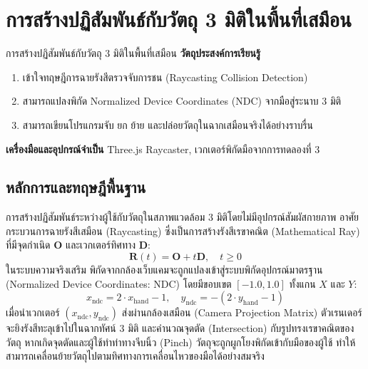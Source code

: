 
\chapter{การสร้างปฏิสัมพันธ์กับวัตถุ 3 มิติในพื้นที่เสมือน}
\label{ch:lab04}


\vspace{0.4cm}

\begin{labobjectivebox}{การสร้างปฏิสัมพันธ์กับวัตถุ 3 มิติในพื้นที่เสมือน}
\textbf{วัตถุประสงค์การเรียนรู้}
\begin{enumerate}[leftmargin=1.8cm, itemsep=2pt]
    \item เข้าใจทฤษฎีการฉายรังสีตรวจจับการชน (Raycasting Collision Detection)
    \item สามารถแปลงพิกัด Normalized Device Coordinates (NDC) จากมือสู่ระนาบ 3 มิติ
    \item สามารถเขียนโปรแกรมจับ ยก ย้าย และปล่อยวัตถุในฉากเสมือนจริงได้อย่างราบรื่น
\end{enumerate}

\vspace{4pt}
\textbf{เครื่องมือและอุปกรณ์จำเป็น} \enspace Three.js Raycaster, เวกเตอร์พิกัดมือจากการทดลองที่ 3
\end{labobjectivebox}

\section{หลักการและทฤษฎีพื้นฐาน}

การสร้างปฏิสัมพันธ์ระหว่างผู้ใช้กับวัตถุในสภาพแวดล้อม 3 มิติโดยไม่มีอุปกรณ์สัมผัสกายภาพ อาศัยกระบวนการฉายรังสีเสมือน (Raycasting) ซึ่งเป็นการสร้างรังสีเรขาคณิต (Mathematical Ray) ที่มีจุดกำเนิด $\mathbf{O}$ และเวกเตอร์ทิศทาง $\mathbf{D}$:
\begin{equation}
\mathbf{R}(t) = \mathbf{O} + t\mathbf{D}, \quad t \ge 0
\end{equation}
ในระบบความจริงเสริม พิกัดจากกล้องเว็บแคมจะถูกแปลงเข้าสู่ระบบพิกัดอุปกรณ์มาตรฐาน (Normalized Device Coordinates: NDC) โดยมีขอบเขต $[-1.0, 1.0]$ ทั้งแกน $X$ และ $Y$:
\begin{equation}
x_{\text{ndc}} = 2 \cdot x_{\text{hand}} - 1, \quad y_{\text{ndc}} = -(2 \cdot y_{\text{hand}} - 1)
\end{equation}
เมื่อนำเวกเตอร์ $(x_{\text{ndc}}, y_{\text{ndc}})$ ส่งผ่านกล้องเสมือน (Camera Projection Matrix) ตัวเรนเดอร์จะยิงรังสีทะลุเข้าไปในฉากทัศน์ 3 มิติ และคำนวณจุดตัด (Intersection) กับรูปทรงเรขาคณิตของวัตถุ หากเกิดจุดตัดและผู้ใช้ทำท่าทางจีบนิ้ว (Pinch) วัตถุจะถูกผูกโยงพิกัดเข้ากับมือของผู้ใช้ ทำให้สามารถเคลื่อนย้ายวัตถุไปตามทิศทางการเคลื่อนไหวของมือได้อย่างสมจริง

